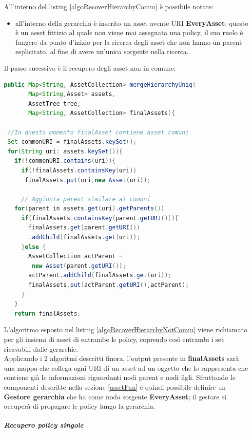 \documentclass[12pt,a4paper,twoside]{book}
\begin{document}
All'interno del listing \ref{algoRecoverHierarchyComm} è possibile notare:
\begin{itemize}
	\item all'interno della gerarchia è inserito un asset avente URI \textbf{EveryAsset}; questo è un asset fittizio al quale non viene mai assegnata una policy, il suo ruolo è fungere da punto d'inizio per la ricerca degli asset che non hanno un parent esplicitato, al fine di avere un'unica sorgente nella ricerca.
\end{itemize}
Il passo sucessivo è il recupero degli asset non in comune:
\begin{lstlisting}[language=java,firstnumber=1,caption={L'algoritmo ha prestazioni lineari in proporzione al numero di asset},label=algoRecoverHierarchyNotComm,captionpos=b]
public Map<String, AssetCollection> mergeHierarchyUniq(
       Map<String,Asset> assets,
       AssetTree tree,
       Map<String, AssetCollection> finalAssets){
       
 //In questo momento finalAsset contiene asset comuni      
 Set commonURI = finalAssets.keySet();  
 for(String uri: assets.keySet()){
   if(!commonURI.contains(uri)){
     if(!finalAssets.containsKey(uri))
      finalAssets.put(uri,new Asset(uri));
      
	 // Aggiunta parent similare ai comuni
   for(parent in assets.get(uri).getParents())
     if(finalAssets.containsKey(parent.getURI())){
       finalAssets.get(parent.getURI())
       .addChild(finalAssets.get(uri));
     }else {
       AssetCollection actParent =
        new Asset(parent.getURI());
       actParent.addChild(finalAssets.get(uri));
       finalAssets.put(actParent.getURI(),actParent);
     }
   }
   return finalAssets;
\end{lstlisting}
L'algoritmo esposto nel listing \ref{algoRecoverHierarchyNotComm} viene richiamato per gli insiemi di asset di entrambe le policy, coprendo così entrambi i set ricavabili dalle gerarchie.\\
Applicando i 2 algoritmi descritti finora, l'output presente in \textbf{finalAssets} sarà una mappa che collega ogni URI di un asset ad un oggetto che lo rappresenta che contiene già le informazioni riguardanti nodi parent e nodi figli. Sfruttando le componenti descritte nella sezione \ref{assetFun} è quindi possibile definire un \textbf{Gestore gerarchia} che ha come nodo sorgente \textbf{EveryAsset}; il gestore si occuperà di propagare le policy lungo la gerarchia.
\subparagraph{Recupero policy singole}\mbox{}\\
\end{document}
